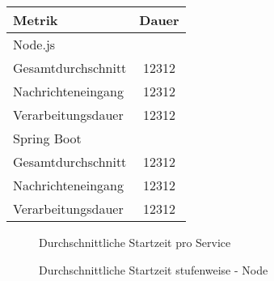\begin{tabular}{@{}lc@{}}
  \toprule
  Metrik & Dauer \\
  \midrule
  Node.js \\
  \hspace{3mm}Gesamtdurchschnitt & 12312 \\
  \hspace{3mm}Nachrichteneingang & 12312 \\
  \hspace{3mm}Verarbeitungsdauer & 12312 \\
  \midrule
  Spring Boot \\
  \hspace{3mm}Gesamtdurchschnitt & 12312 \\
  \hspace{3mm}Nachrichteneingang & 12312 \\
  \hspace{3mm}Verarbeitungsdauer & 12312 \\
  \bottomrule
  \end{tabular}

\begin{figure}
	\centering
	\caption[Startzeit Services]{Durchschnittliche Startzeit pro Service}
\end{figure}

\begin{figure}
	\centering
	\caption[Startzeit Stufenübersicht]{Durchschnittliche Startzeit stufenweise - Node}
\end{figure}





